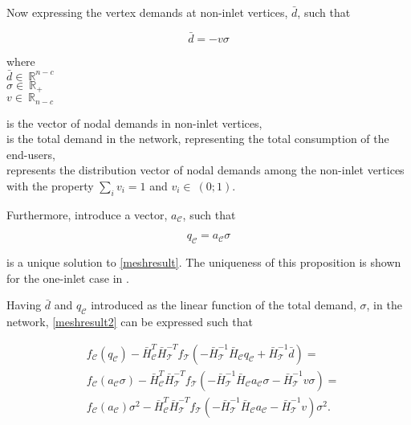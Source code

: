 Now expressing the vertex demands at non-inlet vertices, $\bar{d}$, such that

\begin{equation}
\label{noninlet_demand}
\bar{d} = - v \sigma
\end{equation}

  \begin{minipage}[t]{0.20\textwidth}
where\\
\hspace*{8mm} $\bar{d} \in \: \mathbb{R}^{n-c}$\\
\hspace*{8mm} $\sigma \in \: \mathbb{R}_{+}$ \\
\newline
\hspace*{8mm} $v \in \: \mathbb{R}_{n-c}$
\end{minipage}
\begin{minipage}[t]{0.68\textwidth}
\vspace*{2mm}
is the vector of nodal demands in non-inlet vertices,\\
is the total demand in the network, representing the total consumption of the end-users,\\
represents the distribution vector of nodal demands among the non-inlet vertices with the property $\sum_{i} v_i = 1 $ and $v_i \in \: (0;1)$.
\end{minipage}

Furthermore, introduce a vector, $a_{\mathcal{C}}$, such that 

\begin{equation}
\label{ac}
q_{\mathcal{C}} = a_{\mathcal{C}} \sigma
\end{equation}

is a unique solution to \eqref{meshresult}. The uniqueness of this proposition is shown for the one-inlet case in \cite{oneinput_paper}.

Having $\bar{d}$ and $q_{\mathcal{C}}$ introduced as the linear function of the total demand, $\sigma$, in the network, \eqref{meshresult2} can be expressed such that

\begin{equation}
\begin{split}
\label{meshresult3}
& f_{\mathcal{C}}(q_\mathcal{C}) -\bar{H}^T_{\mathcal{C}}\bar{H}^{-T}_{\mathcal{T}} f_{\mathcal{T}}(-\bar{H}^{-1}_{\mathcal{T}} \bar{H}_{\mathcal{C}} q_\mathcal{C} + \bar{H}^{-1}_{\mathcal{T}} \bar{d}) = \\
& f_{\mathcal{C}}(a_{\mathcal{C}} \sigma) -\bar{H}^T_{\mathcal{C}}\bar{H}^{-T}_{\mathcal{T}} f_{\mathcal{T}}(-\bar{H}^{-1}_{\mathcal{T}} \bar{H}_{\mathcal{C}} a_{\mathcal{C}} \sigma - \bar{H}^{-1}_{\mathcal{T}} v \sigma) = \\
& f_{\mathcal{C}}(a_{\mathcal{C}})\sigma^2 -\bar{H}^T_{\mathcal{C}}\bar{H}^{-T}_{\mathcal{T}} f_{\mathcal{T}}(-\bar{H}^{-1}_{\mathcal{T}} \bar{H}_{\mathcal{C}} a_{\mathcal{C}} - \bar{H}^{-1}_{\mathcal{T}} v) \sigma^2.
\end{split}
\end{equation} 

